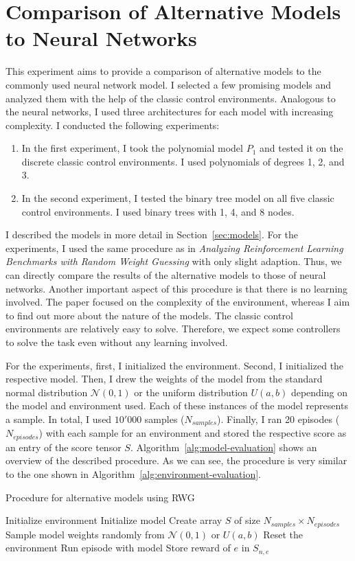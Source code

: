 \section{Comparison of Alternative Models to Neural Networks}
This experiment aims to provide a comparison of alternative models to the commonly used neural network model. I selected a few promising models and analyzed them with the help of the classic control environments. Analogous to the neural networks, I used three architectures for each model with increasing complexity. I conducted the following experiments:
\begin{enumerate}[label=(\alph*)]
  \item In the first experiment, I took the polynomial model $P_1$ and tested it on the discrete classic control environments. I used polynomials of degrees 1, 2, and 3.
  \item In the second experiment, I tested the binary tree model on all five classic control environments. I used binary trees with 1, 4, and 8 nodes.
\end{enumerate}
I described the models in more detail in Section~\ref{sec:models}. For the experiments, I used the same procedure as in \emph{Analyzing Reinforcement Learning Benchmarks with Random Weight Guessing} with only slight adaption. Thus, we can directly compare the results of the alternative models to those of neural networks. Another important aspect of this procedure is that there is no learning involved. The paper focused on the complexity of the environment, whereas I aim to find out more about the nature of the models. The classic control environments are relatively easy to solve. Therefore, we expect some controllers to solve the task even without any learning involved.

For the experiments, first, I initialized the environment. Second, I initialized the respective model. Then, I drew the weights of the model from the standard normal distribution $\mathcal{N}(0,1)$ or the uniform distribution $U(a,b)$ depending on the model and environment used. Each of these instances of the model represents a sample. In total, I used $10'000$ samples ($N_{samples}$). Finally, I ran 20 episodes ($N_{episodes}$) with each sample for an environment and stored the respective score as an entry of the score tensor $S$. Algorithm~\ref{alg:model-evaluation} shows an overview of the described procedure. As we can see, the procedure is very similar to the one shown in Algorithm~\ref{alg:environment-evaluation}.
\begin{algorithm}
\caption{Procedure for alternative models using RWG}
\begin{algorithmic}[1]
\State Initialize environment
\State Initialize model
\State Create array $S$ of size $N_{samples} \times N_{episodes}$
    \State Sample model weights randomly from $\mathcal{N}(0,1)$ or $U(a, b)$
      \State Reset the environment
      \State Run episode with model
      \State Store reward of $e$ in $S_{n,e}$
    \EndFor
\EndFor
\end{algorithmic}
\label{alg:model-evaluation}
\end{algorithm}

